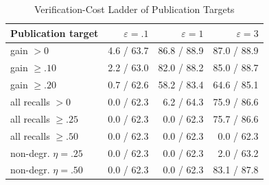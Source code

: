 \begin{table}[t]
\caption{Verification-Cost Ladder of Publication Targets}
\label{tab:verify-ladder}\small
\centering
\begin{tabular}{@{}lrrr@{}}\toprule
Publication target & $\varepsilon=.1$ & $\varepsilon=1$ & $\varepsilon=3$ \\
\midrule
gain $>0$ & 4.6 / 63.7 & 86.8 / 88.9 & 87.0 / 88.9 \\
gain $\ge.10$ & 2.2 / 63.0 & 82.0 / 88.2 & 85.0 / 88.7 \\
gain $\ge.20$ & 0.7 / 62.6 & 58.2 / 83.4 & 64.6 / 85.1 \\
all recalls $>0$ & 0.0 / 62.3 & 6.2 / 64.3 & 75.9 / 86.6 \\
all recalls $\ge.25$ & 0.0 / 62.3 & 0.0 / 62.3 & 75.7 / 86.6 \\
all recalls $\ge.50$ & 0.0 / 62.3 & 0.0 / 62.3 & 0.0 / 62.3 \\
non-degr. $\eta=.25$ & 0.0 / 62.3 & 0.0 / 62.3 & 2.0 / 63.2 \\
non-degr. $\eta=.50$ & 0.0 / 62.3 & 0.0 / 62.3 & 83.1 / 87.8 \\
\bottomrule\end{tabular}
\end{table}
